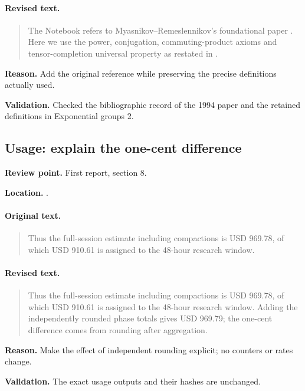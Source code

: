 \paragraph{Revised text.}
\begin{quote}\small
The Notebook refers to Myasnikov--Remeslennikov's foundational paper
\cite{exponential-groups-1}. Here we use the power, conjugation,
commuting-product axioms and tensor-completion universal property
as restated in \cite[Definitions~1--2]{exponential-groups}.
\end{quote}

\noindent\textbf{Reason.} Add the original reference while preserving the precise definitions actually used.

\noindent\textbf{Validation.} Checked the bibliographic record of the 1994 paper and the retained definitions in Exponential groups 2.

\subsection{Usage: explain the one-cent difference}
\noindent\textbf{Review point.} First report, section 8.\par
\noindent\textbf{Location.} .

\paragraph{Original text.}
\begin{quote}\small
Thus the full-session estimate including compactions is USD 969.78,
of which USD 910.61 is assigned to the 48-hour research window.
\end{quote}

\paragraph{Revised text.}
\begin{quote}\small
Thus the full-session estimate including compactions is USD 969.78,
of which USD 910.61 is assigned to the 48-hour research window.
Adding the independently rounded phase totals gives USD 969.79;
the one-cent difference comes from rounding after aggregation.
\end{quote}

\noindent\textbf{Reason.} Make the effect of independent rounding explicit; no counters or rates change.

\noindent\textbf{Validation.} The exact usage outputs and their hashes are unchanged.


